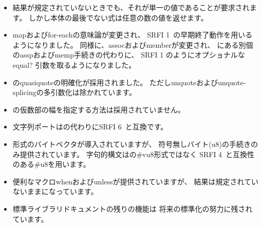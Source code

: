 \begin{itemize}
\item 結果が規定されていないときでも、それが単一の値であることが要求されます。
しかし本体の最後でない式は任意の数の値を返せます。

\item {\cf map}および{\cf for-each}の意味論が変更され、
SRFI 1~\cite{srfi1}の早期終了動作を用いるようになりました。
同様に、{\cf assoc}および{\cf member}が変更され、
\rsixrs{}にある別個の{\cf assp}および{\cf memp}手続きの代わりに、
SRFI 1 のようにオプショナルな{\cf equal?} 引数を取るようになりました。

\item \rsixrs{}の{\cf quasiquote}の明確化が採用されました。
ただし{\cf unquote}および{\cf unquote-splicing}の多引数化は除かれています。

\item \rsixrs{}の仮数部の幅を指定する方法は採用されていません。

\item 文字列ポートは\rsixrs{}の代わりにSRFI 6~\cite{srfi6}と互換です。

\item \rsixrs{}形式のバイトベクタが導入されていますが、
符号無しバイト({\cf u8})の手続きのみ提供されています。
字句的構文は\rsixrs{}の{\cf \#vu8}形式ではなく
SRFI 4~\cite{srfi4}と互換性のある{\cf \#u8}を用います。

\item 便利なマクロ{\cf when}および{\cf unless}が提供されていますが、
結果は規定されていないままになっています。

\item 標準ライブラリドキュメントの残りの機能は
将来の標準化の努力に残されています。

\end{itemize}

